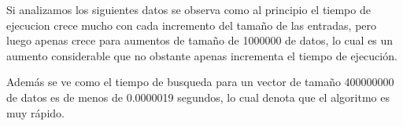 Si analizamos los siguientes datos se observa como al principio el tiempo de ejecucion crece mucho con cada incremento del tamaño de las entradas, pero luego apenas crece para aumentos de tamaño de 1000000 de datos, lo cual es un aumento considerable que no obstante apenas incrementa el tiempo de ejecución.

Además se ve como el tiempo de busqueda para un vector de tamaño 400000000 de datos es de menos de 0.0000019 segundos, lo cual denota que el algoritmo es muy rápido.

